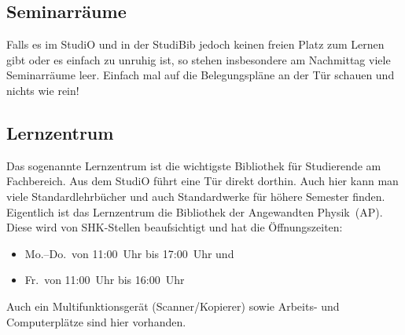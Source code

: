 \begin{multicols*}{2}
\subsection{Seminarräume}
Falls es im StudiO und in der StudiBib jedoch keinen freien Platz zum Lernen gibt oder es einfach zu unruhig ist, so stehen insbesondere am Nachmittag viele Seminarräume leer.
Einfach mal auf die Belegungspläne an der Tür schauen und nichts wie rein!

\subsection{Lernzentrum}
Das sogenannte Lernzentrum ist die wichtigste Bibliothek für Studierende am Fachbereich.
Aus dem StudiO führt eine Tür direkt dorthin.
Auch hier kann man viele Standardlehrbücher und auch Standardwerke für höhere Semester finden.
Eigentlich ist das Lernzentrum die Bibliothek der Angewandten Physik~(AP).
Diese wird von SHK-Stellen beaufsichtigt und hat die Öffnungszeiten:
\begin{itemize}
	\item Mo.--Do.\ von 11:00~Uhr bis 17:00~Uhr und
	\item Fr.\ von 11:00~Uhr bis 16:00~Uhr
\end{itemize}
Auch ein Multifunktionsgerät (Scanner/Kopierer) sowie Arbeits- und Computerplätze sind hier vorhanden.

\begin{center}
\end{center}


\end{multicols*}
